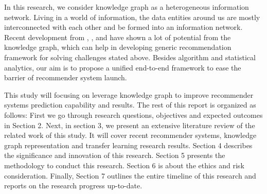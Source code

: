In this research, we consider knowledge graph as a heterogeneous information network. Living in a world of information, the data entities around us are mostly interconnected with each other and be formed into an information network. Recent development from \citet{qin2020survey}, \citet{wang2018ripplenet}, and \citet{xi2020graph} have shown a lot of potential from the knowledge graph, which can help in developing generic recommendation framework for solving challenges stated above. Besides algorithm and statistical analytics, our aim is to propose a unified end-to-end framework to ease the barrier of recommender system launch.


This study will focusing on leverage knowledge graph to improve recommender systems prediction capability and results. The rest of this report is organized as follows: 
First we go through research questions, objectives and expected outcomes in Section 2. Next, in section 3, we present an extensive literature review of the related work of this study. It will cover recent recommender systems, knowledge graph representation and transfer learning research results. Section 4 describes the significance and innovation of this research. Section 5 presents the methodology to conduct this research. Section 6 is about the ethics and risk consideration. Finally, Section 7 outlines the entire timeline of this research and reports on the research progress up-to-date.


